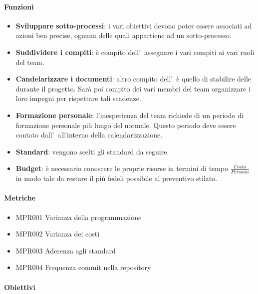 		\paragraph*{Funzioni}
	
		\begin{itemize}
			\item \textbf{Sviluppare sotto-processi}: i vari obiettivi devono poter essere associati ad azioni ben precise, ognuna delle quali appartiene ad un sotto-processo.
			\item \textbf{Suddividere i compiti}: è compito dell'\Amm\ assegnare i vari compiti ai vari ruoli del team.
			\item \textbf{Candelarizzare i documenti}: altro compito dell'\Amm\ è quello di stabilire delle  durante il progetto. Sarà poi compito dei vari membri del team organizzare i loro impegni per rispettare tali scadenze.
			\item \textbf{Formazione personale}: l'inesperienza del team richiede di un periodo di formazione personale più lungo del normale. Questo periodo deve essere contato dall'\Amm\ all'interno della calendarizzazione.
			\item \textbf{Standard}: vengono scelti gli standard da seguire.
			\item \textbf{Budget}: è necessario conoscere le proprie risorse in termini di tempo $\frac{Costo}{Persona}$ in modo tale da restare il più fedeli possibile al preventivo stilato.
		\end{itemize}
	
		\paragraph*{Metriche}
		
		\begin{itemize}
			\item MPR001 Varianza della programmazione
			\item MPR002 Varianza dei costi
			\item MPR003 Aderenza agli standard
			\item MPR004 Frequenza commit nella repository
		\end{itemize}
	
		\paragraph*{Obiettivi}
		
